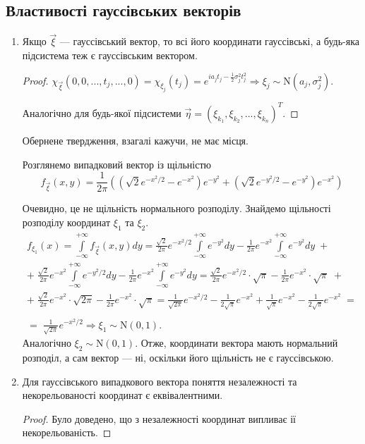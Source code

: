 \subsection{Властивості гауссівських векторів}
\begin{enumerate}
    \item Якщо $\vec{\xi}$ --- гауссівський вектор, то всі його координати гауссівські,
    а будь-яка підсистема теж є гауссівським вектором.
    \begin{proof}
        $\chi_{\vec{\xi}}(0,0,...,t_j, ..., 0) = \chi_{\xi_j}(t_j) = 
        e^{i a_j t_j - \frac{1}{2}\sigma_j^2 t_j^2} \Rightarrow \xi_j \sim \mathrm{N}(a_j, \sigma_j^2)$.

        Аналогічно для будь-якої підсистеми $\vec{\eta} = (\xi_{k_1}, \xi_{k_2}, ..., \xi_{k_n})^T$.
    \end{proof}
    \begin{remark}
        Обернене твердження, взагалі кажучи, не має місця.

        Розглянемо випадковий вектор із щільністю
        $$ f_{\vec{\xi}}(x, y) = \frac{1}{2\pi} \left( 
            \left( \sqrt{2} e^{-x^2/2} - e^{-x^2}\right)e^{-y^2} + 
            \left( \sqrt{2} e^{-y^2/2} - e^{-y^2}\right)e^{-x^2}\right)$$

        Очевидно, це не щільність нормального розподілу. Знайдемо щільності розподілу координат $\xi_1$ та $\xi_2$.
        \begin{gather*}
            f_{\xi_1}(x) = \int\limits_{-\infty}^{+\infty}f_{\vec{\xi}}(x, y) dy =
            \frac{\sqrt{2}}{2\pi} e^{-x^2/2}\int\limits_{-\infty}^{+\infty}e^{-y^2}dy -
            \frac{1}{2\pi}e^{-x^2}\int\limits_{-\infty}^{+\infty}e^{-y^2}dy \; +\\
            + \; \frac{\sqrt{2}}{2\pi}e^{-x^2}\int\limits_{-\infty}^{+\infty} e^{-y^2/2}dy - 
            \frac{1}{2\pi} e^{-x^2}\int\limits_{-\infty}^{+\infty}e^{-y^2}dy =
            \frac{\sqrt{2}}{2\pi} e^{-x^2/2}\cdot \sqrt{\pi} - \frac{1}{2\pi}e^{-x^2} \cdot \sqrt{\pi} \; + \\
            + \; \frac{\sqrt{2}}{2\pi}e^{-x^2} \cdot \sqrt{2\pi} - \frac{1}{2\pi}e^{-x^2}\cdot \sqrt{\pi} = 
            \frac{1}{\sqrt{2\pi}}e^{-x^2/2} - \frac{1}{2\sqrt{\pi}}e^{-x^2} + \frac{1}{\sqrt{\pi}}e^{-x^2} - \frac{1}{2\sqrt{\pi}}e^{-x^2} \; = \\ 
            \\ = \; \frac{1}{\sqrt{2\pi}}e^{-x^2/2} \Rightarrow \xi_1 \sim \mathrm{N}(0, 1).
        \end{gather*}
        Аналогічно $\xi_2 \sim \mathrm{N}(0, 1)$. Отже, координати вектора мають нормальний розподіл, а сам вектор --- ні,
        оскільки його щільність не є гауссівською.
    \end{remark}
    \item Для гауссівського випадкового вектора поняття незалежності та некорельованості координат є еквівалентними.
    \begin{proof}
        Було доведено, що з незалежності координат випливає ії некорельованість.


\end{proof}
\end{enumerate}
